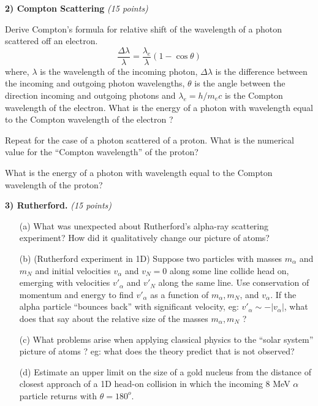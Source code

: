 {\large



\textbf{2) Compton Scattering } \hfill \textit{(15 points)}

Derive Compton's formula for relative shift of the wavelength of a photon scattered off an electron.
\begin{equation*}
\frac{\Delta \lambda}{\lambda} = \frac{\lambda_e}{\lambda}  (1 - \cos \theta) 
\end{equation*}
where, $\lambda$ is the wavelength of the incoming photon, $\Delta \lambda$ is the difference between the incoming and outgoing photon wavelengths,  $\theta$ is the angle between the direction incoming and outgoing photons and $\lambda_e = h/m_e c $ is the Compton wavelength of the electron.
What is the energy of a photon with wavelength equal to the Compton wavelength of the electron ?

Repeat for the case of a photon scattered of a proton. What is the numerical value for the ``Compton wavelength'' of the proton?

What is the energy of a photon with wavelength equal to the Compton wavelength of the proton?

\vspace*{0.5in}

\textbf{3) Rutherford.}  \hfill \textit{(15 points)}
\begin{itemize}
\item[(a)]
What was unexpected about Rutherford's alpha-ray scattering experiment? How did it qualitatively change our picture of atoms?
\item[(b)]
(Rutherford experiment in 1D) Suppose two particles with masses $m_\alpha$ and $m_N$ and initial velocities $v_\alpha$ and $v_N = 0$ along some line collide head on, emerging with velocities $v'_\alpha$ and $v'_N$ along the same line. Use conservation of momentum and energy to find $v'_\alpha$ as a function of $m_\alpha, m_N$, and $v_\alpha $.  If the alpha particle ``bounces back'' with significant velocity, eg: $v'_\alpha \sim - |v_\alpha|$, what does that say about the relative size of the masses $m_\alpha, m_N$ ?
\item[(c)]
What problems arise when applying classical physics to the ``solar system'' picture of atoms ? eg: what does the theory predict that is not observed?
\item[(d)]
Estimate an upper limit on the size of a gold nucleus from the distance of closest approach of a 1D head-on collision in which the incoming 8 MeV $\alpha$ particle returns with $\theta = 180^o$.
\end{itemize}

}
